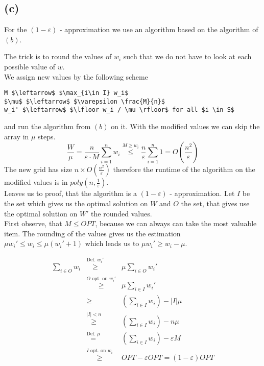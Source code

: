 \documentclass[11pt,a4paper,ngerman]{article}
\begin{document}
\subsection*{(c)}

For the $(1 - \varepsilon)$ - approximation we use an algorithm based on the algorithm of $(b)$.

The trick is to round the values of $w_i$ such that we do not have to look at each possible value of $w$.\\

We assign new values by the following scheme

\begin{lstlisting}
M $\leftarrow$ $\max_{i\in I} w_i$
$\mu$ $\leftarrow$ $\varepsilon \frac{M}{n}$
w_i' $\leftarrow$ $\lfloor w_i / \mu \rfloor$ for all $i \in S$
\end{lstlisting}

and run the algorithm from $(b)$ on it.
With the modified values we can skip the array in $\mu$ steps.
$$
\frac{W}{\mu} = \frac{n}{\varepsilon \cdot M} \overset{n}{\underset{i=1}{\sum}} w_i \stackrel{M \geq w_i}{\leq} \frac{n}{\varepsilon} \overset{n}{\underset{i=1}{\sum}} 1 = O (\frac{n^2}{\varepsilon})
$$
The new grid has size $n \times O (\frac{n^2}{\varepsilon})$ therefore the runtime of the algorithm on the modified values is
in $poly(n, \frac{1}{\varepsilon})$.\\
Leaves us to proof, that the algorithm is a $(1-\varepsilon)$ - approximation.
Let $I$ be the set which gives us the optimal solution on $W$ and $O$ the set, that gives use the optimal solution on $W'$ the rounded values.\\

First observe, that $M \leq OPT$, because we can always can take the most valuable item. The rounding of the values gives us the estimation 
$ \mu w_i' \leq w_i \leq \mu (w_i' + 1)$ which leads us to $\mu w_i'  \geq w_i - \mu$.

$$\begin{array}{rcl}
    \underset{i \in O}{\sum} w_i &\stackrel{\text{Def. } w_i'}{\geq}& \mu \underset{i \in O}{\sum} w_i'\\
        &\stackrel{O \text{ opt. on } w_i'}{\geq}& \mu \underset{i \in I}{\sum} w_i'\\
        &\geq& (\underset{i \in I}{\sum} w_i) - |I|\mu\\
        &\stackrel{|I| < n}{\geq}& (\underset{i \in I}{\sum} w_i) - n \mu\\
        &\stackrel{\text{Def. }\mu}{=}& (\underset{i \in I}{\sum} w_i) - \varepsilon M\\
        &\stackrel{I \text{ opt. on }w_i}{\geq}& OPT - \varepsilon OPT = (1-\varepsilon) OPT
\end{array}$$ 
\end{document}
